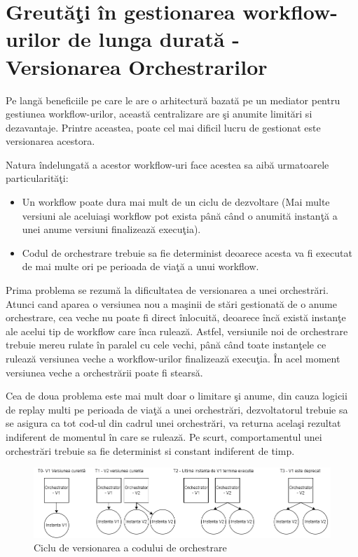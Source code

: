 \section {Greutăţi în gestionarea workflow-urilor de lunga durată - Versionarea Orchestrarilor }
\quad Pe langă beneficiile pe care le are o arhitectură bazată pe un mediator pentru gestiunea workflow-urilor, această centralizare are şi anumite limitări si dezavantaje. Printre aceastea, poate cel mai dificil lucru de gestionat este versionarea acestora.
\par Natura îndelungată a acestor workflow-uri face acestea sa aibă urmatoarele particularităţi: 
\begin{itemize}
\item Un workflow poate dura mai mult de un ciclu de dezvoltare (Mai multe versiuni ale aceluiaşi workflow pot exista până când o anumită instanţă a unei anume versiuni finalizează execuţia). 
\item Codul de orchestrare trebuie sa fie determinist deoarece acesta va fi executat de mai multe ori pe perioada de viaţă a unui workflow. 
\end{itemize}
\par Prima problema se rezumă la dificultatea de versionarea a unei orchestrări. Atunci cand aparea o versiunea nou a maşinii de stări gestionată de o anume orchestrare, cea veche nu poate fi direct înlocuită, deoarece încă există instanţe ale acelui tip de workflow care înca rulează. Astfel, versiunile noi de orchestrare trebuie mereu rulate în paralel cu cele vechi, până când toate instanţele ce rulează versiunea veche a workflow-urilor finalizează execuţia. În acel moment versiunea veche a orchestrării poate fi stearsă. 
\par Cea de doua problema este mai mult doar o limitare şi anume, din cauza logicii de replay multi pe perioada de viaţă a unei orchestrări, dezvoltatorul trebuie sa se asigura ca tot cod-ul din cadrul unei orchestrări, va returna acelaşi rezultat indiferent de momentul în care se rulează. Pe scurt, comportamentul unei orchestrări trebuie sa fie determinist si constant indiferent de timp. 
 \begin{figure}[h]
\begin{center}
        \includegraphics[width=1\textwidth]{images/dtf_versioning}
			 \caption{Ciclu de versionarea a codului de orchestrare}
			 \label{fig:dtf-versioning}
\end{center}
\end{figure}
